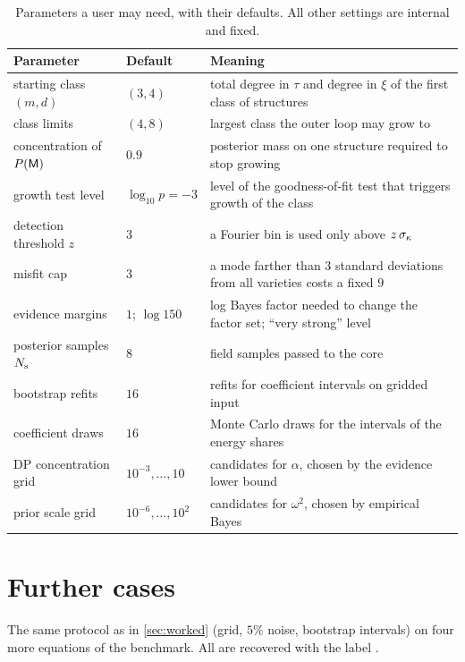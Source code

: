 \begin{table}[htbp]
\centering\small
\caption{Parameters a user may need, with their defaults. All other settings are internal and fixed.}\label{tab:params}
\begin{tabularx}{\linewidth}{@{}l l X@{}}
\toprule
Parameter & Default & Meaning\\
\midrule
starting class $(m,d)$ & $(3,4)$ & total degree in $\tau$ and degree in $\xi$ of the first class of structures\\
class limits & $(4,8)$ & largest class the outer loop may grow to\\
concentration of $P(\mathsf{M})$ & $0.9$ & posterior mass on one structure required to stop growing\\
growth test level & $\log_{10}p=-3$ & level of the goodness-of-fit test that triggers growth of the class\\
detection threshold $z$ & $3$ & a Fourier bin is used only above $z\,\sigma_{\kappa}$\\
misfit cap & $3$ & a mode farther than $3$ standard deviations from all varieties costs a fixed $9$\\
evidence margins & $1$; $\log150$ & log Bayes factor needed to change the factor set; ``very strong'' level~\cite{KasRaf95}\\
posterior samples $N_{\mathrm s}$ & $8$ & field samples passed to the core\\
bootstrap refits & $16$ & refits for coefficient intervals on gridded input\\
coefficient draws & $16$ & Monte Carlo draws for the intervals of the energy shares\\
DP concentration grid & $10^{-3},\dots,10$ & candidates for $\alpha$, chosen by the evidence lower bound\\
prior scale grid & $10^{-6},\dots,10^{2}$ & candidates for $\omega^2$, chosen by empirical Bayes\\
\bottomrule
\end{tabularx}
\end{table}

\section{Further cases}\label{app:cases}
The same protocol as in \cref{sec:worked} (grid, $5\%$ noise, bootstrap intervals) on four more equations of the
benchmark. All are recovered with the label \FC.


